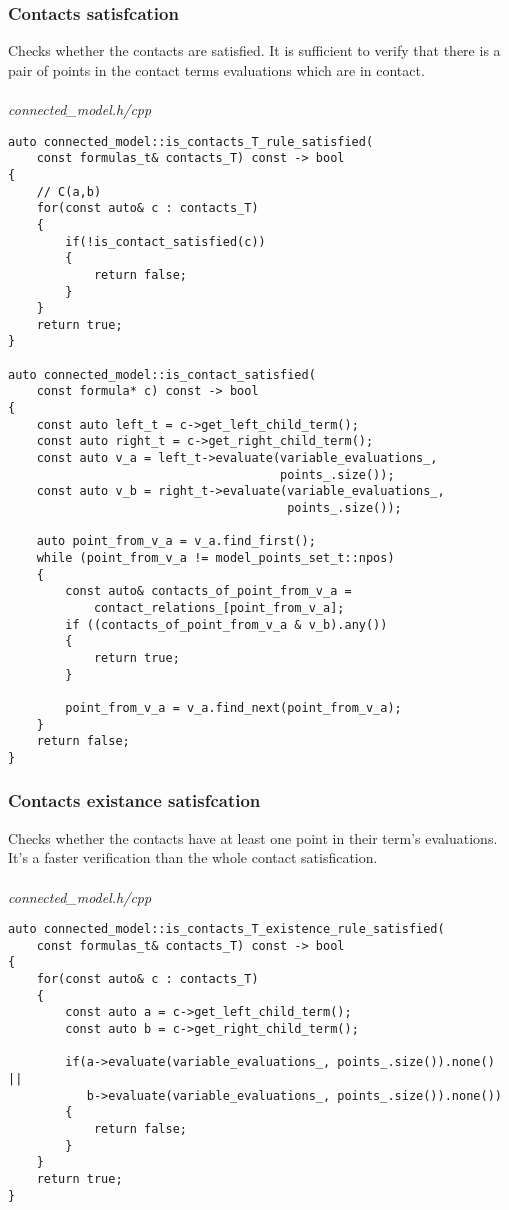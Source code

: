 \documentclass{article}
\begin{document}
	\subsubsection*{Contacts satisfcation}
	Checks whether the contacts are satisfied. It is sufficient to verify that there is a pair of points in the contact terms evaluations which are in contact.
\\
\\
\noindent
\textit{connected\_model.h/cpp}
\begin{lstlisting}
auto connected_model::is_contacts_T_rule_satisfied(
	const formulas_t& contacts_T) const -> bool
{
    // C(a,b)
    for(const auto& c : contacts_T)
    {
        if(!is_contact_satisfied(c))
        {
            return false;
        }
    }
    return true;
}

auto connected_model::is_contact_satisfied(
	const formula* c) const -> bool
{
    const auto left_t = c->get_left_child_term();
    const auto right_t = c->get_right_child_term();
    const auto v_a = left_t->evaluate(variable_evaluations_,
                                      points_.size());
    const auto v_b = right_t->evaluate(variable_evaluations_,
                                       points_.size());

    auto point_from_v_a = v_a.find_first();
    while (point_from_v_a != model_points_set_t::npos)
    {
        const auto& contacts_of_point_from_v_a =
            contact_relations_[point_from_v_a];
        if ((contacts_of_point_from_v_a & v_b).any())
        {
            return true;
        }

        point_from_v_a = v_a.find_next(point_from_v_a);
    }
    return false;
}
\end{lstlisting}

	\newpage
	\subsubsection*{Contacts existance satisfcation}
	Checks whether the contacts have at least one point in their term's evaluations. It's a faster verification than the whole contact satisfication.
\\
\\
\noindent
\textit{connected\_model.h/cpp}
\begin{lstlisting}
auto connected_model::is_contacts_T_existence_rule_satisfied(
	const formulas_t& contacts_T) const -> bool
{
    for(const auto& c : contacts_T)
    {
        const auto a = c->get_left_child_term();
        const auto b = c->get_right_child_term();

        if(a->evaluate(variable_evaluations_, points_.size()).none() ||
           b->evaluate(variable_evaluations_, points_.size()).none())
        {
            return false;
        }
    }
    return true;
}
\end{lstlisting}
\end{document}
